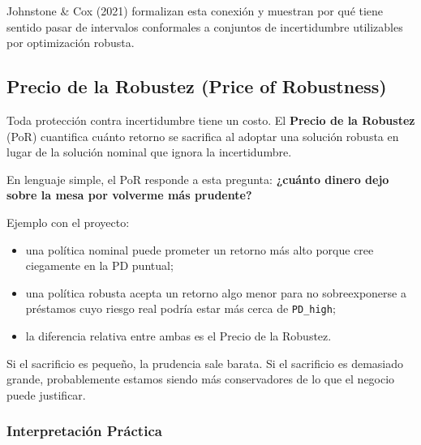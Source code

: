 \documentclass[
  spanish,
  11pt,
  letterpaper,
]{scrbook}
\providecommand{\tightlist}{%
  \setlength{\itemsep}{0pt}\setlength{\parskip}{0pt}}
\theoremstyle{plain}
\theoremstyle{remark}
\begin{document}
Johnstone \& Cox (2021) formalizan esta conexión y muestran por qué
tiene sentido pasar de intervalos conformales a conjuntos de
incertidumbre utilizables por optimización robusta.

\subsection{Precio de la Robustez (Price of
Robustness)}\label{sec-price-of-robustness}

Toda protección contra incertidumbre tiene un costo. El \textbf{Precio
de la Robustez} (PoR) cuantifica cuánto retorno se sacrifica al adoptar
una solución robusta en lugar de la solución nominal que ignora la
incertidumbre.

En lenguaje simple, el PoR responde a esta pregunta: \textbf{¿cuánto
dinero dejo sobre la mesa por volverme más prudente?}

Ejemplo con el proyecto:

\begin{itemize}
\tightlist
\item
  una política nominal puede prometer un retorno más alto porque cree
  ciegamente en la PD puntual;
\item
  una política robusta acepta un retorno algo menor para no
  sobreexponerse a préstamos cuyo riesgo real podría estar más cerca de
  \texttt{PD\_high};
\item
  la diferencia relativa entre ambas es el Precio de la Robustez.
\end{itemize}

Si el sacrificio es pequeño, la prudencia sale barata. Si el sacrificio
es demasiado grande, probablemente estamos siendo más conservadores de
lo que el negocio puede justificar.

\subsubsection{Interpretación
Práctica}\label{interpretaciuxf3n-pruxe1ctica-1}
\end{document}
